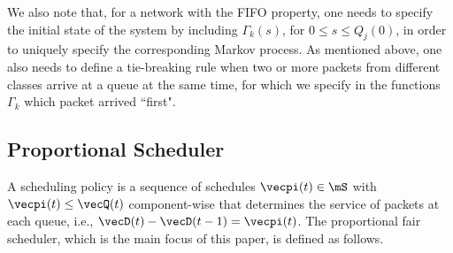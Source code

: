 \documentclass{amsart}
\begin{document}
We also note that, for a network with the FIFO property, one needs to
specify the initial state of the system by including $\Gamma_k(s)$, for $0\leq s \leq Q_j(0)$, in order to uniquely specify the corresponding Markov process.  
As mentioned above, one also needs to define a tie-breaking rule when two or more packets from different classes arrive at a queue at the same time, 
for which we specify in the functions $\Gamma_k$  which packet arrived  ``first".

\iffalse
From our notational convention, it is clear that $A_j(t), A_k(t)$ and $A_r(t)$ each refer to different arrival processes: the cummulative arrivals at queue $j$, the cummulative arrivals at class $k$ and the cummulative arrivals on route $r$.
We let $Q_j(t)\in\bZ_+$ be the queue size of queue $j$ at time $t$. Let $A_j(t)\in\bZ_+$ be the total number of arrivals at queue $j\in\mJ$ by time $t$ -- including external, internal arrivals and packets initial in the queue at time zero. Let $D_j(t)\in\bZ_+$ be the total number of departures from queue $j$ by time $t$. Thus we have that
\begin{equation}
Q_j(t) = A_j(t) - D_j(t).
\end{equation}
Note in the above definition, we define $Q_j(0)=A_j(0)$.
Given the class $k\in\mK$, we let $A_k(t)\in\bZ_+$ and $D_k(t)\in\bZ_+$ be the total number of class $k$ packets to, respectively, arrive and depart from queue $j(k)$.
For a route $r\in\mR$ the number of arrived and departed packets, $A_r(t)$ and $D_r(t)$, is given by the number of arrived packets of class $i(r)$, respectively departed packets of class $o(r)$,  from and to the outside, $\out$. That is, $A_r(t)=A_{i(r)}(t)$ and $D_r(t)=D_{o(r)}(t)$.
\fi

\subsection{Proportional Scheduler}
A scheduling policy is a sequence of schedules $\vecpi(t)\in\mS$ with $\vecpi(t) \leq \vecQ(t)$ component-wise
 that determines the service of packets at each queue, i.e., $\vecD(t)-\vecD(t-1)=\vecpi(t)$. The proportional fair scheduler, which is the main focus of this paper, is defined as follows.
 
\end{document}
